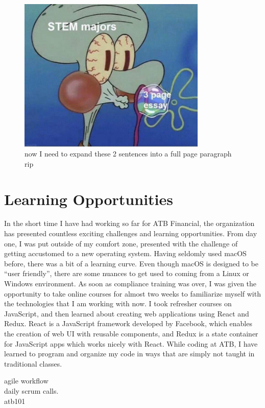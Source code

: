 \documentclass[letterpaper,12pt]{article}
\begin{document}
\begin{figure}[ht]
 \centering
 \includegraphics[width=0.8\textwidth]{stem.jpg}
 \caption{now I need to expand these 2 sentences into a full page paragraph rip}
\end{figure}

\section{Learning Opportunities}

In the short time I have had working so far for ATB Financial, the organization has presented
countless exciting challenges and learning opportunities.
From day one, I was put outside of my comfort zone, presented with the challenge of
getting accustomed to a new operating system. Having seldomly used macOS before,
there was a bit of a learning curve. Even though macOS is designed to be ``user friendly'',
there are some nuances to get used to coming from a Linux or Windows environment.
As soon as compliance training was over, I was given the opportunity to take online
courses for almost two weeks to familiarize myself with the technologies that I am
working with now. I took refresher courses on JavaScript, and then learned
about creating web applications using React and Redux. React is a JavaScript framework developed by Facebook,
which enables the creation of web UI with reusable components\cite{react}, and Redux is a state container
for JavaScript apps\cite{redux} which works nicely with React. While coding at ATB,
I have learned to program and organize my code in ways that are simply not taught in traditional
classes.

agile workflow\\
daily scrum calls.\\
atb101
\end{document}
